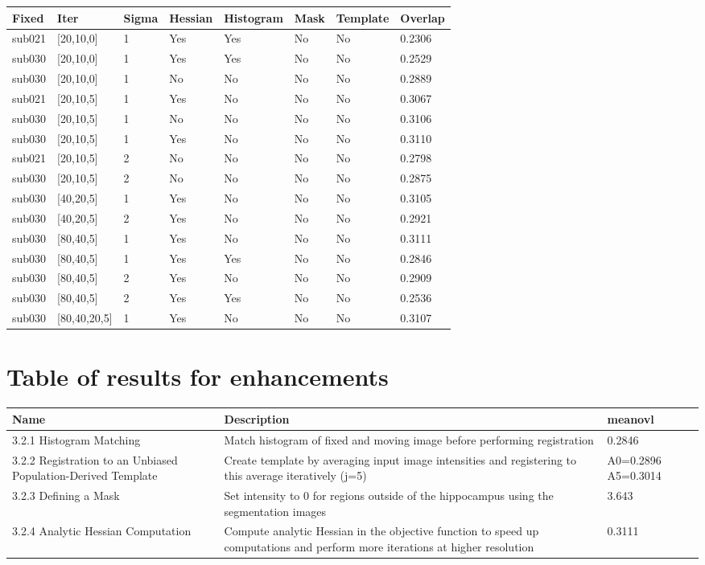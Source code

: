 \documentclass{article}
\begin{document}
\begin{par}
		\begin{tabular}{ | p{1.5cm} | p{1.5cm} | p{1.5cm} | p{1.5cm} | p{1.7cm} | p{1.5cm} | p{1.7cm} | p{1.5cm} |  }
			\hline 
			Fixed & Iter & Sigma & Hessian & Histogram & Mask & Template & Overlap \\ \hline \hline 
			sub021 & [20,10,0] & 1 & Yes & Yes & No & No & 0.2306 \\ \hline
			sub030 & [20,10,0] & 1 & Yes & Yes & No & No & 0.2529 \\ \hline
			sub030 & [20,10,0] & 1 & No & No & No & No & 0.2889 \\ \hline
			sub021 & [20,10,5] & 1 & Yes & No & No & No & 0.3067 \\ \hline
			sub030 & [20,10,5] & 1 & No & No & No & No & 0.3106 \\ \hline
			sub030 & [20,10,5] & 1 & Yes & No & No & No & 0.3110 \\ \hline
			sub021 & [20,10,5] & 2 & No & No & No & No & 0.2798 \\ \hline
			sub030 & [20,10,5] & 2 & No & No & No & No & 0.2875 \\ \hline
			sub030 & [40,20,5] & 1 & Yes & No & No & No & 0.3105 \\ \hline
			sub030 & [40,20,5] & 2 & Yes & No & No & No & 0.2921 \\ \hline
			sub030 & [80,40,5] & 1 & Yes & No & No & No & 0.3111 \\ \hline
			sub030 & [80,40,5] & 1 & Yes & Yes & No & No & 0.2846 \\ \hline
			sub030 & [80,40,5] & 2 & Yes & No & No & No & 0.2909 \\ \hline
			sub030 & [80,40,5] & 2 & Yes & Yes & No & No & 0.2536 \\ \hline
			sub030 & [80,40,20,5] & 1 & Yes & No & No & No & 0.3107 \\ \hline
			
		\end{tabular}
		
		\section{Table of results for enhancements}
		\begin{tabular}{|p{5cm}|p{8cm}|p{2cm}|}
			\hline
			Name & Description& meanovl \\ \hline \hline
			3.2.1 Histogram Matching & Match histogram of fixed and moving image before performing registration & 0.2846 \\ \hline
			3.2.2 Registration to an Unbiased Population-Derived Template & Create template by averaging input image intensities and registering to this average iteratively (j=5) & A0=0.2896 A5=0.3014\\ \hline
			3.2.3 Defining a Mask & Set intensity to 0 for regions outside of the hippocampus using the segmentation images & 3.643 \\ \hline
			3.2.4 Analytic Hessian Computation & Compute analytic Hessian in the objective function to speed up computations and perform more iterations at higher resolution & 0.3111 \\ \hline
		\end{tabular}

		
		



	\end{par}
	
\end{document}
